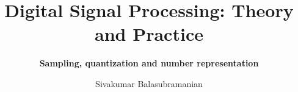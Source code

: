 \documentclass{beamer}
\title{Digital Signal Processing: Theory and Practice}
\subtitle{\textbf{Sampling, quantization and number representation}}
\author{Sivakumar Balasubramanian}
\institute[Christian Medical College] %
{
  \inst{}%
  Department of Bioengineering\\
  Christian Medical College, Bagayam\\
  Vellore 632002
}
\date{}
\begin{document}
\begin{frame}
  \titlepage
\end{frame}

%
%
%
%
%
%
%
%
%
%
%
%
%
%
\end{document}
